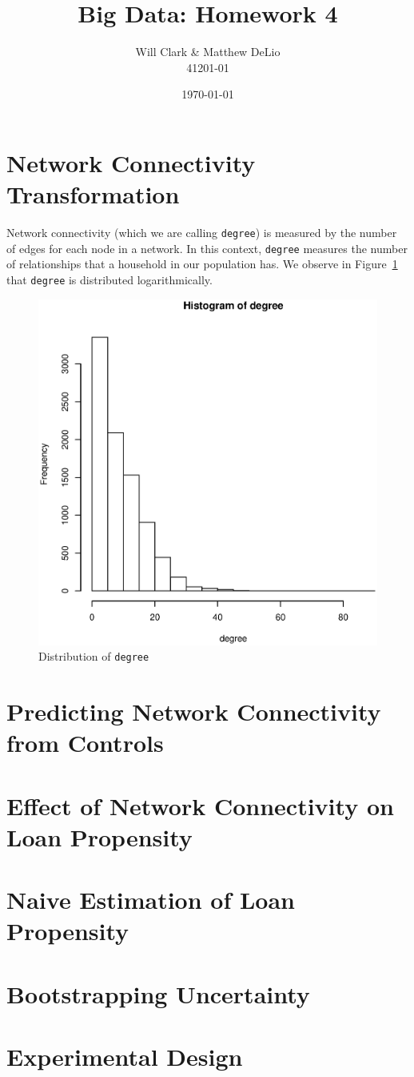 \documentclass[11pt, fleqn]{article}
\begin{document}
\title{Big Data: Homework 4}
\author{Will Clark \& Matthew DeLio \\ 41201-01}
\date{\today}
\maketitle

\section{Network Connectivity Transformation}

Network connectivity (which we are calling \texttt{degree}) is measured by the number of edges for each node in a network. In this context, \texttt{degree} measures the number of relationships that a household in our population has. We observe in Figure~\ref{fig:degrees} that \texttt{degree} is distributed logarithmically.

\begin{figure}[!htb]
  \centering
  \includegraphics[scale=.5]{degrees.eps}
  \caption{Distribution of \texttt{degree}}
  \label{fig:degrees}
\end{figure}

\section{Predicting Network Connectivity from Controls}

\section{Effect of Network Connectivity on Loan Propensity}

\section{Naive Estimation of Loan Propensity}

\section{Bootstrapping Uncertainty}

\section{Experimental Design}
\end{document}

